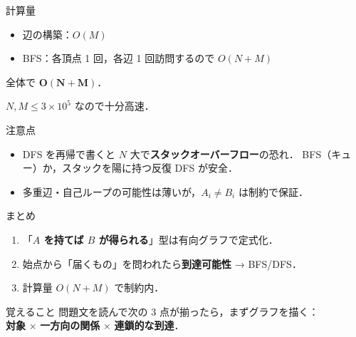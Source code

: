 \documentclass[dvipdfmx,aspectratio=169]{beamer}
\begin{document}
\begin{frame}{計算量}
  \begin{itemize}
    \item 辺の構築：$O(M)$
    \item BFS：各頂点 1 回，各辺 1 回訪問するので $O(N + M)$
  \end{itemize}

  \vspace{0.8em}
  全体で $\mathbf{O(N + M)}$．\par
  $N, M \le 3 \times 10^5$ なので十分高速．

  \vspace{0.8em}
  \begin{block}{注意点}
    \begin{itemize}
      \item DFS を再帰で書くと $N$ 大で\textbf{スタックオーバーフロー}の恐れ．
        BFS（キュー）か，スタックを陽に持つ反復 DFS が安全．
      \item 多重辺・自己ループの可能性は薄いが，$A_i \ne B_i$ は制約で保証．
    \end{itemize}
  \end{block}
\end{frame}

\begin{frame}{まとめ}
  \begin{enumerate}
    \item 「\textbf{$A$ を持てば $B$ が得られる}」型は有向グラフで定式化．
    \item 始点から「届くもの」を問われたら\textbf{到達可能性} → BFS/DFS．
    \item 計算量 $O(N+M)$ で制約内．
  \end{enumerate}

  \vspace{1em}
  \begin{block}{覚えること}
    問題文を読んで次の 3 点が揃ったら，まずグラフを描く：\\
    \textbf{対象} × \textbf{一方向の関係} × \textbf{連鎖的な到達}．
  \end{block}
\end{frame}
\end{document}
